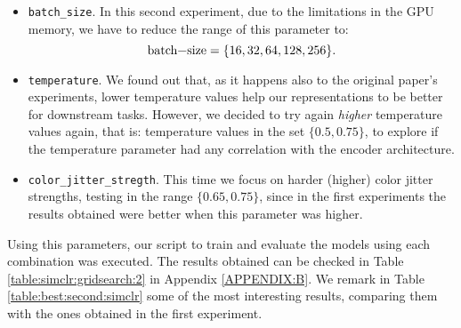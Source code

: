     \begin{itemize}
        \item \lstinline{batch_size}. In this second experiment, due to the limitations in the GPU memory, we have to reduce the range of this parameter to:
        $$
        \text{\lstinline{batch-size}}=\{16,32,64,128,256\}.
        $$

        \item \lstinline{temperature}. We found out that, as it happens also to the original paper's experiments, lower temperature values help our representations to be better for downstream tasks. However, we decided to try again \emph{higher} temperature values again, that is: temperature values in the set $\{0.5,0.75\}$, to explore if the temperature parameter had any correlation with the encoder architecture.
        
        \item \lstinline{color_jitter_stregth}. This time we focus on harder (higher) color jitter strengths, testing in the range $\{0.65,0.75\}$, since in the first experiments the results obtained were better when this parameter was higher.
        
\end{itemize}

    Using this parameters, our script to train and evaluate the models using each combination was executed. The results obtained can be checked in Table \ref{table:simclr:gridsearch:2} in Appendix \ref{APPENDIX:B}. We remark in Table \ref{table:best:second:simclr} some of the most interesting results, comparing them with the ones obtained in the first experiment.

    \begin{table}[H]
    \centering
    \caption{Best results for the second grid search experiment with SimCLR.}
    
    \label{table:best:second:simclr}
    \end{table}

